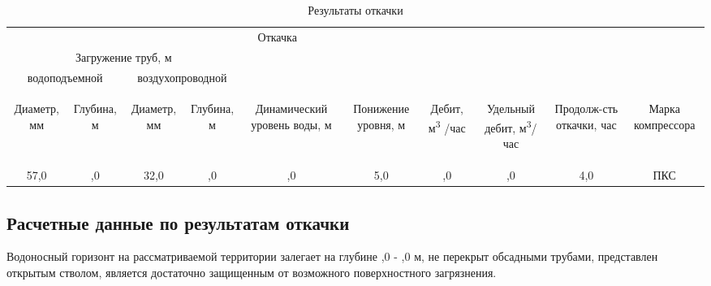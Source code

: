 \documentclass[a4paper,12pt]{article} %
\newcommand{\txtDepth}{,0}					%
\newcommand{\txtDebit}{,0}						%
\newcommand{\txtHorizDepth}{,0}				%
\newcommand{\txtPumpResults}{
57,0 & 		%
,0 & 		%
32,0 & 		%
,0 &		%
,0  & 		%
5,0  &		%
\txtDebit & %
,0  &		%
4,0  &		%
ПКС			%
}			%
\begin{document}
\begin{table}[!h]
	\caption{Результаты откачки}
	\centering\begin{tabular}{|c|c|c|c|c|c|c|c|c|c|}
	\hline 
	\multicolumn{8}{|c|}{Откачка}&  &  \\ 
	\cline{1-8} 
	\multicolumn{4}{|c|}{Загружение труб, м} &  &  &  &  &  &  \\ 
	\cline{1-4} 
	\multicolumn{2}{|c|}{водоподъемной} & \multicolumn{2}{c|}{воздухопроводной} &  &  &  &  &  & \\ 
	\cline{1-4} 
	\begin{sideways}Диаметр, мм\end{sideways} &
	\begin{sideways}Глубина, м\end{sideways} &
	\begin{sideways}Диаметр, мм\end{sideways} &
	\begin{sideways}Глубина, м\end{sideways} &
	\begin{sideways}Динамический уровень воды, м\end{sideways} &
	\begin{sideways}Понижение уровня, м\end{sideways} &
	\begin{sideways}Дебит, м\textsuperscript{3} /час\end{sideways} &
	\begin{sideways}Удельный дебит, м\textsuperscript{3}/час \end{sideways} &
	\begin{sideways}Продолж-сть откачки, час\end{sideways} &
	\begin{sideways}Марка компрессора\end{sideways} \\ 
	\hline 
	\txtPumpResults \\ 
	\hline 
\end{tabular} 
\end{table}

\subsection*{Расчетные данные по результатам откачки}

Водоносный горизонт на рассматриваемой территории залегает на глубине 	{\txtHorizDepth} - {\txtDepth}	м, не перекрыт обсадными трубами, представлен открытым стволом, является достаточно защищенным от возможного поверхностного загрязнения.
\end{document}
